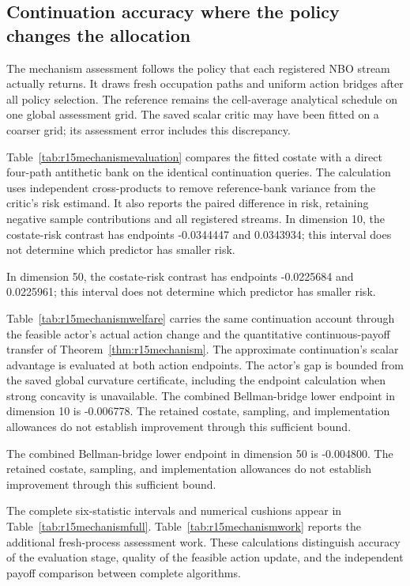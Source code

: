 \subsection{Continuation accuracy where the policy changes the allocation}
\label{sec:r15mechanismevidence}
The mechanism assessment follows the policy that each registered NBO stream
actually returns. It draws fresh occupation paths and uniform action bridges
after all policy selection. The reference remains the cell-average analytical
schedule on one global assessment grid. The saved scalar critic may have been
fitted on a coarser grid; its assessment error includes this discrepancy.

Table~\ref{tab:r15mechanismevaluation} compares the fitted costate with a direct
four-path antithetic bank on the identical continuation queries. The calculation
uses independent cross-products to remove reference-bank variance from the
critic's risk estimand. It also reports the paired difference in risk, retaining
negative sample contributions and all registered streams.
In dimension 10, the costate-risk contrast has endpoints -0.0344447 and 0.0343934; this interval does not determine which predictor has smaller risk.

In dimension 50, the costate-risk contrast has endpoints -0.0225684 and 0.0225961; this interval does not determine which predictor has smaller risk.

Table~\ref{tab:r15mechanismwelfare} carries the same continuation account
through the feasible actor's actual action change and the quantitative
continuous-payoff transfer of Theorem~\ref{thm:r15mechanism}. The approximate
continuation's scalar advantage is evaluated at both action endpoints. The
actor's gap is bounded from the saved global curvature certificate, including
the endpoint calculation when strong concavity is unavailable.
The combined Bellman-bridge lower endpoint in dimension 10 is -0.006778. The retained costate, sampling, and implementation allowances do not establish improvement through this sufficient bound.

The combined Bellman-bridge lower endpoint in dimension 50 is -0.004800. The retained costate, sampling, and implementation allowances do not establish improvement through this sufficient bound.

The complete six-statistic intervals and numerical cushions appear in
Table~\ref{tab:r15mechanismfull}. Table~\ref{tab:r15mechanismwork} reports the
additional fresh-process assessment work. These calculations distinguish
accuracy of the evaluation stage, quality of the feasible action update,
and the independent payoff comparison between complete algorithms.
